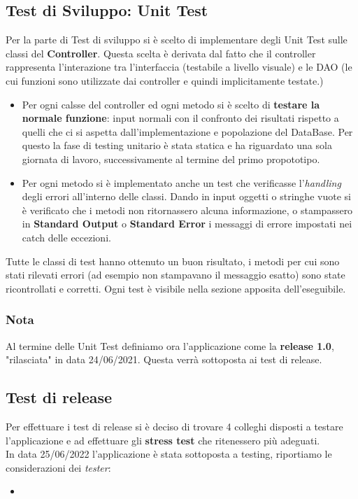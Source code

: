 \documentclass[11pt]{article}
\begin{document}
        \subsection{Test di Sviluppo: Unit Test}
        Per la parte di Test di sviluppo si è scelto di implementare degli Unit Test sulle classi del \textbf{Controller}. Questa scelta è derivata dal fatto che il controller rappresenta l'interazione tra l'interfaccia (testabile a livello visuale) e le DAO (le cui funzioni sono utilizzate dai controller e quindi implicitamente testate.)\\
            \begin{itemize}
                \item Per ogni calsse del controller ed ogni metodo si è scelto di \textbf{testare la normale funzione}: input normali con il confronto dei risultati rispetto a quelli che ci si aspetta dall'implementazione e popolazione del DataBase. Per questo la fase di testing unitario è stata statica e ha riguardato una sola giornata di lavoro, successivamente al termine del primo propototipo.
                \item Per ogni metodo si è implementato anche un test che verificasse l'\textit{handling} degli errori all'interno delle classi. Dando in input oggetti o stringhe vuote si è verificato che i metodi non ritornassero alcuna informazione, o stampassero in \textbf{Standard Output} o \textbf{Standard Error} i messaggi di errore impostati nei catch delle eccezioni.
            \end{itemize}
        Tutte le classi di test hanno ottenuto un buon risultato, i metodi per cui sono stati rilevati errori (ad esempio non stampavano il messaggio esatto) sono state ricontrollati e corretti. Ogni test è visibile nella sezione apposita dell'eseguibile.
        
        \subsubsection*{Nota}
        Al termine delle Unit Test definiamo ora l'applicazione come la \textbf{release 1.0}, "rilasciata" in data 24/06/2021. Questa verrà sottoposta ai test di release.

    \newpage
        \subsection{Test di release}
        Per effettuare i test di release si è deciso di trovare 4 colleghi disposti a testare l'applicazione e ad effettuare gli \textbf{stress test} che ritenessero più adeguati.\\
        In data 25/06/2022 l'applicazione è stata sottoposta a testing, riportiamo le considerazioni dei \textit{tester}:
            \begin{itemize}
                \item 
            \end{itemize}
\end{document}
